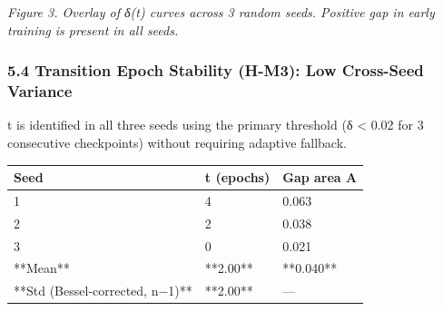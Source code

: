 \textit{Figure 3. Overlay of δ(t) curves across 3 random seeds. Positive gap in early training is present in all seeds.}

\subsubsection{5.4 Transition Epoch Stability (H-M3): Low Cross-Seed Variance}

t\* is identified in all three seeds using the primary threshold (δ < 0.02 for 3 consecutive checkpoints) without requiring adaptive fallback.

\begin{table}[htbp]
\centering
\begin{tabular}{lll}
\toprule
Seed & t\* (epochs) & Gap area A \\
\midrule
1 & 4 & 0.063 \\
2 & 2 & 0.038 \\
3 & 0 & 0.021 \\
**Mean** & **2.00** & **0.040** \\
**Std (Bessel-corrected, n−1)** & **2.00** & — \\
\bottomrule
\end{tabular}
\end{table}

